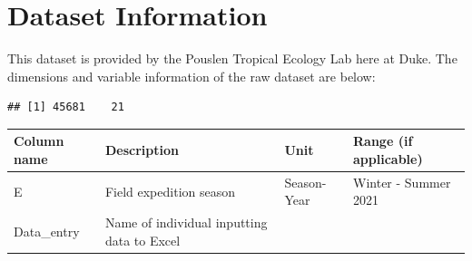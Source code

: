 \documentclass[
  12pt,
]{article}
\begin{document}
\newpage

\hypertarget{dataset-information}{%
\section{Dataset Information}\label{dataset-information}}

This dataset is provided by the Pouslen Tropical Ecology Lab here at
Duke. The dimensions and variable information of the raw dataset are
below:

\begin{verbatim}
## [1] 45681    21
\end{verbatim}

\begin{longtable}[]{@{}llll@{}}
\toprule
\begin{minipage}[b]{0.18\columnwidth}\raggedright
Column name\strut
\end{minipage} & \begin{minipage}[b]{0.35\columnwidth}\raggedright
Description\strut
\end{minipage} & \begin{minipage}[b]{0.18\columnwidth}\raggedright
Unit\strut
\end{minipage} & \begin{minipage}[b]{0.18\columnwidth}\raggedright
Range (if applicable)\strut
\end{minipage}\tabularnewline
\midrule
\endhead
\begin{minipage}[t]{0.18\columnwidth}\raggedright
E\strut
\end{minipage} & \begin{minipage}[t]{0.35\columnwidth}\raggedright
Field expedition season\strut
\end{minipage} & \begin{minipage}[t]{0.18\columnwidth}\raggedright
Season-Year\strut
\end{minipage} & \begin{minipage}[t]{0.18\columnwidth}\raggedright
Winter - Summer 2021\strut
\end{minipage}\tabularnewline
\begin{minipage}[t]{0.18\columnwidth}\raggedright
Data\_entry\strut
\end{minipage} & \begin{minipage}[t]{0.35\columnwidth}\raggedright
Name of individual inputting data to Excel\strut
\end{minipage} & \begin{minipage}[t]{0.18\columnwidth}\raggedright

\end{minipage}
\end{longtable}
\end{document}
